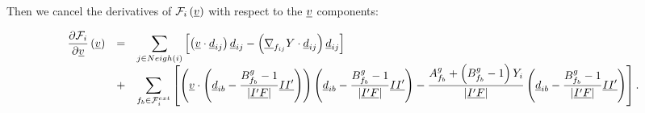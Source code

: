 Then we cancel the derivatives of
$\mathcal{F}_i \left( \underline{v} \right)$ with respect to the $ \underline{v}$ components:

\begin{equation}\label{eq:spadis:gradmc_function_derivative}
\begin{array}{r c l}
\dfrac{\partial \mathcal{F}_i}{\partial \underline{v} }
\left( \underline{v} \right)& =&
\displaystyle
\sum\limits_{ j \in Neigh\left(i\right) }\left[
\left(\underline{v}   \cdot \underline{d}_{ij} \right) \underline{d}_{ij}
-  \left(\underline{\nabla}_{{f_{ij}}} Y   \cdot \underline{d}_{ij} \right)  \underline{d}_{ij}
\right] \\
&+&
\displaystyle
\sum\limits_{ {f_{b}} \in \mathcal{F}^{ext}_{i}}\left[
  \left( \underline{v}   \cdot
  \left( \underline{d}_{ib} -  \dfrac{B^g_{f_{b}} -1 }{\left| \underline{{I^\prime} F} \right|} \underline{I {I^\prime}} \right) \right)
  \left( \underline{d}_{ib} -  \dfrac{B^g_{f_{b}} -1 }{\left| \underline{{I^\prime} F} \right|} \underline{I {I^\prime}} \right)
-
\dfrac{
A^g_{f_{b}} +\left(B^g_{f_{b}} -1 \right) Y_i
}{
\left| \underline{{I^\prime} F} \right|
}
\left( \underline{d}_{ib} -  \dfrac{B^g_{f_{b}} -1 }{\left| \underline{{I^\prime} F} \right|} \underline{I {I^\prime}} \right)
\right].
\end{array}
\end{equation}


